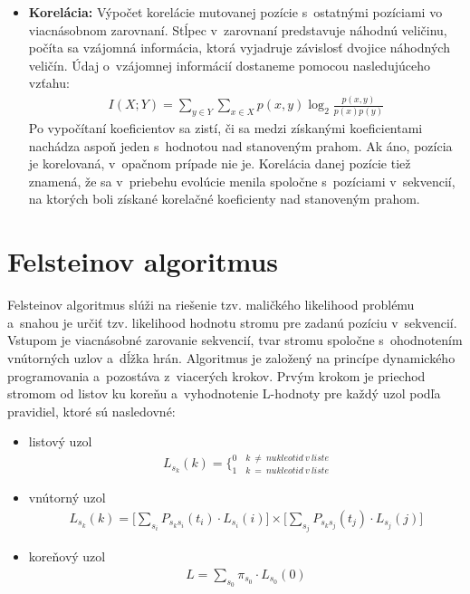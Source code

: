 \begin{itemize}
	\item \textbf{Korelácia:} Výpočet korelácie mutovanej pozície s~ostatnými pozíciami vo viacnásobnom zarovnaní. Stĺpec v~zarovnaní predstavuje náhodnú veličinu, počíta sa vzájomná informácia, ktorá vyjadruje závislosť dvojice náhodných veličín. Údaj o~vzájomnej informácií dostaneme pomocou nasledujúceho vzťahu: 	
	\begin{align}
	I(X;Y) = \underset{y \in Y}{\sum} \underset{x \in X}{\sum} p(x,y) \log_{2}\frac{p(x,y)}{p(x) p(y)}
	\end{align}  
	Po vypočítaní koeficientov sa zistí, či sa medzi získanými koeficientami nachádza aspoň jeden s~hodnotou nad stanoveným prahom. Ak áno, pozícia je korelovaná, v~opačnom prípade nie je. Korelácia danej pozície tiež znamená, že sa v~priebehu evolúcie menila spoločne s~pozíciami v~sekvencií, na ktorých boli získané korelačné koeficienty nad stanoveným prahom. 
	
\end{itemize}

\section{Felsteinov algoritmus}
\label{felstein}
Felsteinov algoritmus slúži na riešenie tzv. maličkého likelihood problému a~snahou je určiť tzv. likelihood hodnotu stromu pre zadanú pozíciu v~sekvencií. Vstupom je viacnásobné zarovanie sekvencií, tvar stromu spoločne s~ohodnotením vnútorných uzlov a~dĺžka hrán. 
Algoritmus je založený na princípe dynamického programovania a~pozostáva z~viacerých krokov.
Prvým krokom je priechod stromom od listov ku koreňu a~vyhodnotenie L-hodnoty pre každý uzol podľa pravidiel, ktoré sú nasledovné:
\begin{itemize}
	\item listový uzol
	\begin{align}
	L_{s_{k}} (k) = \bigg\{_{1\quad k\ =\ nukleotid\ v\  liste}^{0\quad k\ \neq\ nukleotid\ v\  liste}
	\end{align}  
	
	\item vnútorný uzol
	\begin{align}
	L_{s_{k}} (k) = \Bigg[\underset{s_{i}}{\sum}P_{s_{k}s_{i}}(t_{i})\cdotp L_{s_{i}}(i)\Bigg] \times \Bigg[\underset{s_{j}}{\sum}P_{s_{k}s_{j}}(t_{j})\cdotp L_{s_{j}}(j)\Bigg]
	\end{align}
	
	\item koreňový uzol
	\begin{align}
	L = \underset{s_{0}}{\sum}\pi_{s_{0}} \cdotp L_{s_{0}}(0)
	\end{align} 

\end{itemize}

